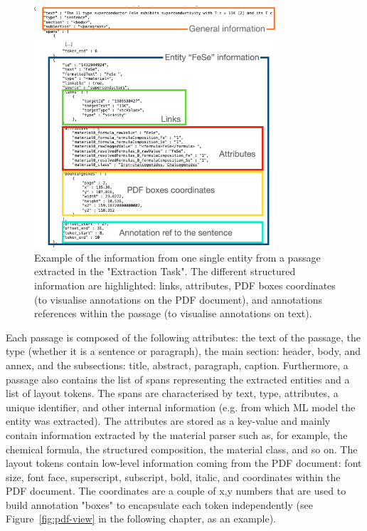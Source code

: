 \begin{figure}[htbp]
  \centering
  \includegraphics[width=0.8\textwidth]{figures/curation/data-flow-2} 
  \caption{Example of the information from one single entity from a passage extracted in the "Extraction Task". The different structured information are highlighted: links, attributes, PDF boxes coordinates (to visualise annotations on the PDF document), and annotations references within the passage (to visualise annotations on text).}
  \label{fig:data-flow-2}
\end{figure}

Each passage is composed of the following attributes: the text of the passage, the type (whether it is a sentence or paragraph), the main section: header, body, and annex, and the subsections: title, abstract, paragraph, caption.
Furthermore, a passage also contains the list of spans representing the extracted entities and a list of layout tokens. 
The spans are characterised by text, type, attributes, a unique identifier, and other internal information (e.g. from which ML model the entity was extracted). 
The attributes are stored as a key-value and mainly contain information extracted by the material parser such as, for example, the chemical formula, the structured composition, the material class, and so on.
The layout tokens contain low-level information coming from the PDF document: font size, font face, superscript, subscript, bold, italic, and coordinates within the PDF document. The coordinates are a couple of x,y numbers that are used to build annotation "boxes" to encapsulate each token independently (see Figure~\ref{fig:pdf-view} in the following chapter, as an example). 

